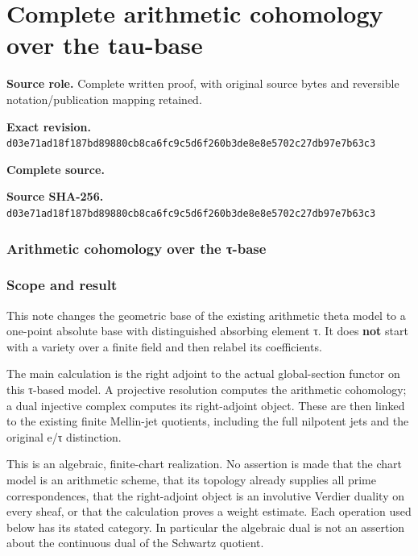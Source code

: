 \begingroup

\section{Complete arithmetic cohomology over the tau-base}


\begingroup
\sloppy
\small
\makeatletter
\let\EndpointOriginalTagForm\tagform@
\def\tagform@#1{\EndpointOriginalTagForm{TauBase\, #1}}
\makeatother

\noindent\textbf{Source role.} Complete written proof, with original source bytes and reversible notation/publication mapping retained.\par
\noindent\textbf{Exact revision.} \nolinkurl{d03e71ad18f187bd89880cb8ca6fc9c5d6f260b3de8e8e5702c27db97e7b63c3}\par
\noindent\textbf{Complete source.} \par
\noindent\textbf{Source SHA-256.} \nolinkurl{d03e71ad18f187bd89880cb8ca6fc9c5d6f260b3de8e8e5702c27db97e7b63c3}\par\medskip
\subsubsection{Arithmetic cohomology over the τ-base}\label{endpoint-tau_base--arithmetic-cohomology-over-the-ux3c4-base}

\subsubsection{Scope and result}\label{endpoint-tau_base--scope-and-result}

This note changes the geometric base of the existing arithmetic theta model to a one-point absolute base with distinguished absorbing element τ. It does \textbf{not} start with a variety over a finite field and then relabel its coefficients.

The main calculation is the right adjoint to the actual global-section functor on this τ-based model. A projective resolution computes the arithmetic cohomology; a dual injective complex computes its right-adjoint object. These are then linked to the existing finite Mellin-jet quotients, including the full nilpotent jets and the original e/τ distinction.

This is an algebraic, finite-chart realization. No assertion is made that the chart model is an arithmetic scheme, that its topology already supplies all prime correspondences, that the right-adjoint object is an involutive Verdier duality on every sheaf, or that the calculation proves a weight estimate. Each operation used below has its stated category. In particular the algebraic dual is not an assertion about the continuous dual of the Schwartz quotient.


